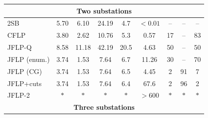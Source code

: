 \documentclass{article}
\begin{document}
\begin{table}[H]
\begin{tabular}{lcccccccc}
\multicolumn{9}{c}{\textbf{Two substations}} \\
\midrule
2SB & 5.70 & 6.10 & 24.19 & 4.7 & $< 0.01$ & -- & -- & -- \\
CFLP & 3.80 & 2.62 & 10.76 & 5.3 & 0.57 & 17 & -- & 83 \\
JFLP-Q & 8.58 & 11.18 & 42.19 & 20.5 & 4.63 & 50 & -- & 50 \\
JFLP (enum.) & 3.74 & 1.53 & 7.64 & 6.7 & 11.26 & 30 & -- & 70 \\
JFLP (CG) & 3.74 & 1.53 & 7.64 & 6.5 & 4.45 & 2 & 91 & 7 \\
JFLP+cuts & 3.74 & 1.53 & 7.64 & 6.4 & 67.6 & 2 & 96 & 2 \\
JFLP-2 & $\ast$ & $\ast$ & $\ast$ & $\ast$ & $> 600$ & $\ast$ & $\ast$ & $\ast$ \\
\midrule
\multicolumn{9}{c}{\textbf{Three substations}} \\
\midrule

\end{tabular}
\end{table}
\end{document}
